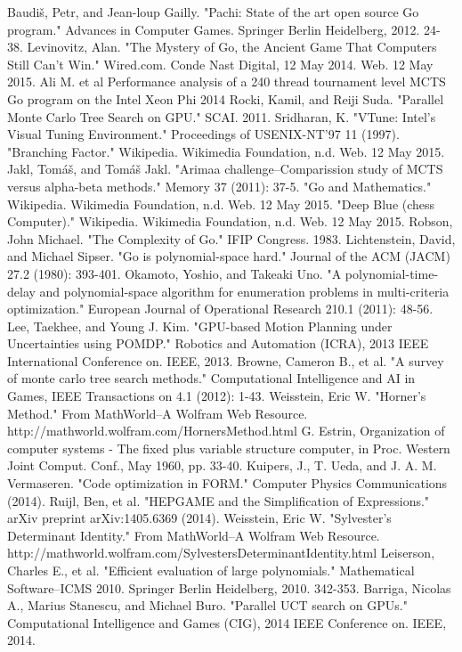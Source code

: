 \documentclass[nocopyrightspace, 10pt]{sigplanconf}
\begin{document}
\begin{thebibliography}{9}
 Baudiš, Petr, and Jean-loup Gailly. "Pachi: State of the art open source Go program." Advances in Computer Games. Springer Berlin Heidelberg, 2012. 24-38.
 Levinovitz, Alan. "The Mystery of Go, the Ancient Game That Computers Still Can’t Win." Wired.com. Conde Nast Digital, 12 May 2014. Web. 12 May 2015.
 Ali M. et al Performance analysis of a 240 thread tournament level MCTS Go program on the Intel Xeon Phi 2014
 Rocki, Kamil, and Reiji Suda. "Parallel Monte Carlo Tree Search on GPU." SCAI. 2011.
 Sridharan, K. "VTune: Intel’s Visual Tuning Environment." Proceedings of USENIX-NT’97 11 (1997).
 "Branching Factor." Wikipedia. Wikimedia Foundation, n.d. Web. 12 May 2015.
 Jakl, Tomáš, and Tomáš Jakl. "Arimaa challenge–Comparission study of MCTS versus alpha-beta methods." Memory 37 (2011): 37-5.
 "Go and Mathematics." Wikipedia. Wikimedia Foundation, n.d. Web. 12 May 2015.
 "Deep Blue (chess Computer)." Wikipedia. Wikimedia Foundation, n.d. Web. 12 May 2015.
 Robson, John Michael. "The Complexity of Go." IFIP Congress. 1983.
 Lichtenstein, David, and Michael Sipser. "Go is polynomial-space hard." Journal of the ACM (JACM) 27.2 (1980): 393-401.
 Okamoto, Yoshio, and Takeaki Uno. "A polynomial-time-delay and polynomial-space algorithm for enumeration problems in multi-criteria optimization." European Journal of Operational Research 210.1 (2011): 48-56.
 Lee, Taekhee, and Young J. Kim. "GPU-based Motion Planning under Uncertainties using POMDP." Robotics and Automation (ICRA), 2013 IEEE International Conference on. IEEE, 2013.
 Browne, Cameron B., et al. "A survey of monte carlo tree search methods." Computational Intelligence and AI in Games, IEEE Transactions on 4.1 (2012): 1-43.
 Weisstein, Eric W. "Horner's Method." From MathWorld--A Wolfram Web Resource. http://mathworld.wolfram.com/HornersMethod.html
 G. Estrin, Organization of computer systems - The fixed plus variable structure computer, in Proc. Western Joint Comput. Conf., May 1960, pp. 33-40.
 Kuipers, J., T. Ueda, and J. A. M. Vermaseren. "Code optimization in FORM." Computer Physics Communications (2014).
 Ruijl, Ben, et al. "HEPGAME and the Simplification of Expressions." arXiv preprint arXiv:1405.6369 (2014).
 Weisstein, Eric W. "Sylvester's Determinant Identity." From MathWorld--A Wolfram Web Resource. http://mathworld.wolfram.com/SylvestersDeterminantIdentity.html
 Leiserson, Charles E., et al. "Efficient evaluation of large polynomials." Mathematical Software–ICMS 2010. Springer Berlin Heidelberg, 2010. 342-353.
 Barriga, Nicolas A., Marius Stanescu, and Michael Buro. "Parallel UCT search on GPUs." Computational Intelligence and Games (CIG), 2014 IEEE Conference on. IEEE, 2014.
\end{thebibliography}
\end{document}
